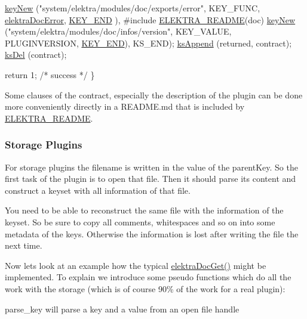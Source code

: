 \begin{DoxyCodeInclude}
                \hyperlink{group__key_gad23c65b44bf48d773759e1f9a4d43b89}{keyNew} (\textcolor{stringliteral}{"system/elektra/modules/doc/exports/error"},
                        KEY\_FUNC, \hyperlink{group__plugin_gad74b35f558ac7c3262f6069c5c47dc79}{elektraDocError}, \hyperlink{group__key_gga91fb3178848bd682000958089abbaf40aa8adb6fcb92dec58fb19410eacfdd403}{KEY\_END}
      ),
#include \hyperlink{group__plugin_ga78d616f68bf9fb0942f66478597467c6}{ELEKTRA\_README}(doc)
                \hyperlink{group__key_gad23c65b44bf48d773759e1f9a4d43b89}{keyNew} (\textcolor{stringliteral}{"system/elektra/modules/doc/infos/version"},
                        KEY\_VALUE, PLUGINVERSION, \hyperlink{group__key_gga91fb3178848bd682000958089abbaf40aa8adb6fcb92dec58fb19410eacfdd403}{KEY\_END}),
                KS\_END);
                \hyperlink{group__keyset_ga21eb9c3a14a604ee3a8bdc779232e7b7}{ksAppend} (returned, contract);
                \hyperlink{group__keyset_ga27e5c16473b02a422238c8d970db7ac8}{ksDel} (contract);

                \textcolor{keywordflow}{return} 1; \textcolor{comment}{/* success */}
        \}
\end{DoxyCodeInclude}
 Some clauses of the contract, especially the description of the plugin can be done more conveniently directly in a R\-E\-A\-D\-M\-E.\-md that is included by \hyperlink{group__plugin_ga78d616f68bf9fb0942f66478597467c6}{E\-L\-E\-K\-T\-R\-A\-\_\-\-R\-E\-A\-D\-M\-E}.\hypertarget{group__plugin_storage}{}\subsubsection{Storage Plugins}\label{group__plugin_storage}
For storage plugins the filename is written in the value of the parent\-Key. So the first task of the plugin is to open that file. Then it should parse its content and construct a keyset with all information of that file.

You need to be able to reconstruct the same file with the information of the keyset. So be sure to copy all comments, whitespaces and so on into some metadata of the keys. Otherwise the information is lost after writing the file the next time.

Now lets look at an example how the typical \hyperlink{group__plugin_gacb69f3441c6d84241b4362f958fbe313}{elektra\-Doc\-Get()} might be implemented. To explain we introduce some pseudo functions which do all the work with the storage (which is of course 90\% of the work for a real plugin)\-:
\begin{DoxyItemize}
\item parse\-\_\-key will parse a key and a value from an open file handle
\end{DoxyItemize}

